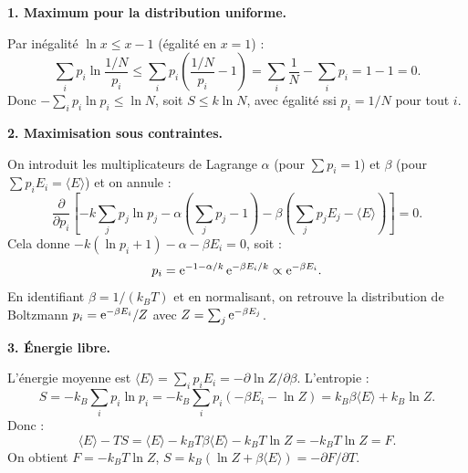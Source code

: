 \documentclass[12pt,a4paper]{article}
\begin{document}
\begin{boitecorrige}

\textbf{1. Maximum pour la distribution uniforme.}

Par inégalité $\ln x \le x - 1$ (égalité en $x=1$) :
\[
\sum_i p_i \ln\frac{1/N}{p_i} \le \sum_i p_i\!\left(\frac{1/N}{p_i} - 1\right) = \sum_i \frac{1}{N} - \sum_i p_i = 1 - 1 = 0.
\]
Donc $-\sum_i p_i \ln p_i \le \ln N$, soit $S \le k\ln N$, avec égalité ssi $p_i = 1/N$ pour tout $i$.

\textbf{2. Maximisation sous contraintes.}

On introduit les multiplicateurs de Lagrange $\alpha$ (pour $\sum p_i = 1$) et $\beta$ (pour $\sum p_i E_i = \langle E\rangle$) et on annule :
\[
\frac{\partial}{\partial p_i}\!\left[-k\sum_j p_j\ln p_j - \alpha\!\left(\sum_j p_j - 1\right) - \beta\!\left(\sum_j p_j E_j - \langle E\rangle\right)\right] = 0.
\]
Cela donne $-k(\ln p_i + 1) - \alpha - \beta E_i = 0$, soit :
\[
p_i = \mathrm{e}^{-1-\alpha/k}\,\mathrm{e}^{-\beta E_i/k} \propto \mathrm{e}^{-\beta E_i}.
\]
En identifiant $\beta = 1/(k_B T)$ et en normalisant, on retrouve la distribution de Boltzmann $p_i = \mathrm{e}^{-\beta E_i}/Z$ avec $Z = \sum_j \mathrm{e}^{-\beta E_j}$.

\textbf{3. Énergie libre.}

L'énergie moyenne est $\langle E\rangle = \sum_i p_i E_i = -\partial\ln Z/\partial\beta$. L'entropie :
\[
S = -k_B\sum_i p_i \ln p_i = -k_B\sum_i p_i(-\beta E_i - \ln Z) = k_B\beta\langle E\rangle + k_B\ln Z.
\]
Donc :
\[
\langle E\rangle - TS = \langle E\rangle - k_B T\beta\langle E\rangle - k_B T\ln Z = -k_B T\ln Z = F.
\]
On obtient $F = -k_B T\ln Z$, $S = k_B(\ln Z + \beta\langle E\rangle) = -\partial F/\partial T$.

\end{boitecorrige}

\ifdefined\inMainDoc\else
\end{document}
